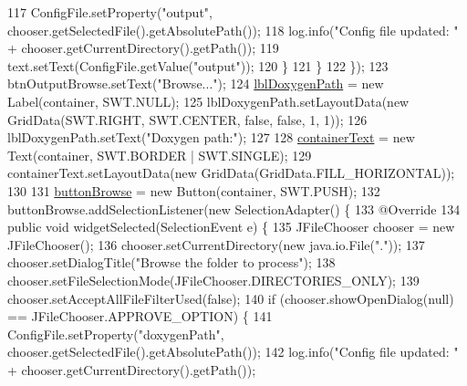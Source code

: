 \begin{DoxyCode}
117                     ConfigFile.setProperty(\textcolor{stringliteral}{"output"}, chooser.getSelectedFile().getAbsolutePath());
118                     log.info(\textcolor{stringliteral}{"Config file updated: "} + chooser.getCurrentDirectory().getPath());
119                     text.setText(ConfigFile.getValue(\textcolor{stringliteral}{"output"}));
120                 \}
121             \}
122         \});
123         btnOutputBrowse.setText(\textcolor{stringliteral}{"Browse..."});
124         \hyperlink{classit_1_1isislab_1_1masonhelperdocumentation_1_1mason_1_1wizards_1_1_b___project_information_page_a204ffc289609a627b90d6c31b2105c1b}{lblDoxygenPath} = \textcolor{keyword}{new} Label(container, SWT.NULL);
125         lblDoxygenPath.setLayoutData(\textcolor{keyword}{new} GridData(SWT.RIGHT, SWT.CENTER, \textcolor{keyword}{false}, \textcolor{keyword}{false}, 1, 1));
126         lblDoxygenPath.setText(\textcolor{stringliteral}{"Doxygen path:"});
127 
128         \hyperlink{classit_1_1isislab_1_1masonhelperdocumentation_1_1mason_1_1wizards_1_1_b___project_information_page_a0951101436c6e108b0dcbea4b8a5cfd7}{containerText} = \textcolor{keyword}{new} Text(container, SWT.BORDER | SWT.SINGLE);
129         containerText.setLayoutData(\textcolor{keyword}{new} GridData(GridData.FILL\_HORIZONTAL));
130 
131         \hyperlink{classit_1_1isislab_1_1masonhelperdocumentation_1_1mason_1_1wizards_1_1_b___project_information_page_ac64957cf0d484de5c9aec87db660cfb7}{buttonBrowse} = \textcolor{keyword}{new} Button(container, SWT.PUSH);
132         buttonBrowse.addSelectionListener(\textcolor{keyword}{new} SelectionAdapter() \{
133             @Override
134             \textcolor{keyword}{public} \textcolor{keywordtype}{void} widgetSelected(SelectionEvent e) \{
135                 JFileChooser chooser = \textcolor{keyword}{new} JFileChooser();
136                 chooser.setCurrentDirectory(\textcolor{keyword}{new} java.io.File(\textcolor{stringliteral}{"."}));
137                 chooser.setDialogTitle(\textcolor{stringliteral}{"Browse the folder to process"});
138                 chooser.setFileSelectionMode(JFileChooser.DIRECTORIES\_ONLY);
139                 chooser.setAcceptAllFileFilterUsed(\textcolor{keyword}{false});
140                 \textcolor{keywordflow}{if} (chooser.showOpenDialog(null) == JFileChooser.APPROVE\_OPTION) \{                  
141                     ConfigFile.setProperty(\textcolor{stringliteral}{"doxygenPath"}, chooser.getSelectedFile().getAbsolutePath());
142                     log.info(\textcolor{stringliteral}{"Config file updated: "} + chooser.getCurrentDirectory().getPath());

\end{DoxyCode}
